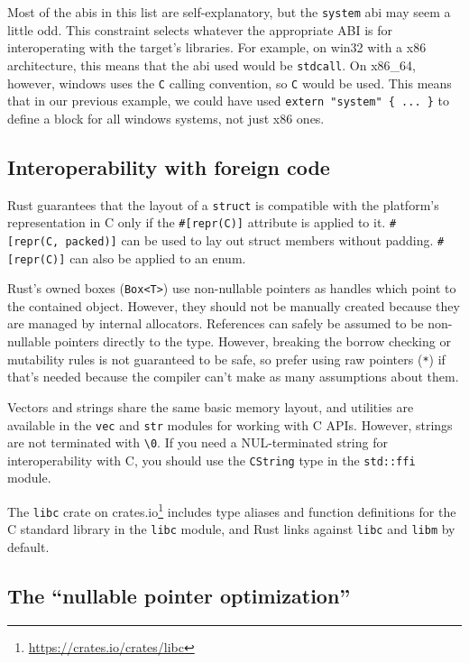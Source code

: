 \documentclass[a4paper,]{book}
\renewcommand{\href}[2]{#2\footnote{\url{#1}}}
\begin{document}
Most of the abis in this list are self-explanatory, but the
\texttt{system} abi may seem a little odd. This constraint selects
whatever the appropriate ABI is for interoperating with the target's
libraries. For example, on win32 with a x86 architecture, this means
that the abi used would be \texttt{stdcall}. On x86\_64, however,
windows uses the \texttt{C} calling convention, so \texttt{C} would be
used. This means that in our previous example, we could have used
\texttt{extern\ "system"\ \{\ ...\ \}} to define a block for all windows
systems, not just x86 ones.

\subsection{Interoperability with foreign
code}\label{interoperability-with-foreign-code}

Rust guarantees that the layout of a \texttt{struct} is compatible with
the platform's representation in C only if the \texttt{\#{[}repr(C){]}}
attribute is applied to it. \texttt{\#{[}repr(C,\ packed){]}} can be
used to lay out struct members without padding. \texttt{\#{[}repr(C){]}}
can also be applied to an enum.

Rust's owned boxes (\texttt{Box\textless{}T\textgreater{}}) use
non-nullable pointers as handles which point to the contained object.
However, they should not be manually created because they are managed by
internal allocators. References can safely be assumed to be non-nullable
pointers directly to the type. However, breaking the borrow checking or
mutability rules is not guaranteed to be safe, so prefer using raw
pointers (\texttt{*}) if that's needed because the compiler can't make
as many assumptions about them.

Vectors and strings share the same basic memory layout, and utilities
are available in the \texttt{vec} and \texttt{str} modules for working
with C APIs. However, strings are not terminated with
\texttt{\textbackslash{}0}. If you need a NUL-terminated string for
interoperability with C, you should use the \texttt{CString} type in the
\texttt{std::ffi} module.

The \href{https://crates.io/crates/libc}{\texttt{libc} crate on
crates.io} includes type aliases and function definitions for the C
standard library in the \texttt{libc} module, and Rust links against
\texttt{libc} and \texttt{libm} by default.

\subsection{\texorpdfstring{The ``nullable pointer
optimization''}{The nullable pointer optimization}}\label{the-nullable-pointer-optimization}
\end{document}
